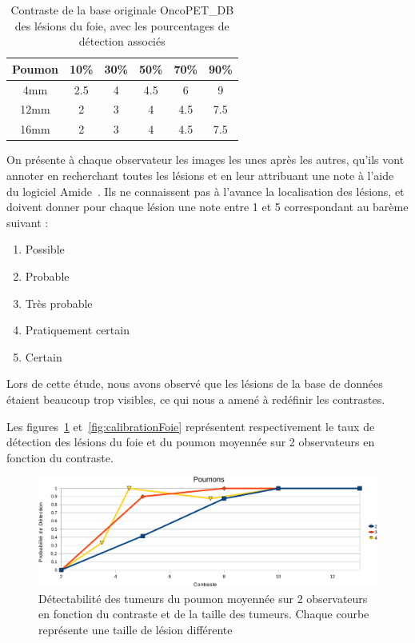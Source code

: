 \begin{table}
\centering
\begin{tabular}{|c||c|c|c|c|c|}
 \hline
Poumon	& 10\% & 30\% & 50\% & 70\% & 90\% \\
\hline
4mm	& 2.5    &  4   &  4.5   & 6   & 9   \\
\hline
12mm    & 2    &  3   &  4   & 4.5   & 7.5   \\
\hline
16mm    & 2    &  3   &  4   & 4.5   & 7.5   \\
\hline
\end{tabular}
\caption[Contraste de la base originale OncoPET\_DB des lésions du foie pour létude de détectabilité]{Contraste de la base originale OncoPET\_DB des lésions du foie, avec les pourcentages de détection associés}
\label{tab:contrasteFoieOrig}
\end{table}

On présente à chaque observateur les images les unes après les autres, qu'ils vont annoter en recherchant toutes les lésions et en leur attribuant une note à l'aide du logiciel Amide~\cite{loening2003amide}. Ils ne connaissent pas à l'avance la localisation des lésions, et doivent donner pour chaque lésion une note entre 1 et 5 correspondant au barème suivant :

\begin{enumerate}
\item Possible
\item Probable
\item Très probable
\item Pratiquement  certain
\item Certain
\end{enumerate}

Lors de cette étude, nous avons observé que les lésions de la base de données étaient beaucoup trop visibles, ce qui nous a amené à redéfinir les contrastes. 


Les figures~\ref{fig:calibration} et~\ref{fig:calibrationFoie}  représentent respectivement le taux de détection des lésions du foie et du poumon moyennée sur 2 observateurs en fonction du contraste.


\begin{figure}[h!]
\begin{center}
\includegraphics[width=15cm]{images/calibration_crop}
\end{center}
\caption{Détectabilité des tumeurs du poumon moyennée sur 2 observateurs en fonction du contraste et de la taille des tumeurs. Chaque courbe représente une taille de lésion différente} 
\label{fig:calibration}
\end{figure}

